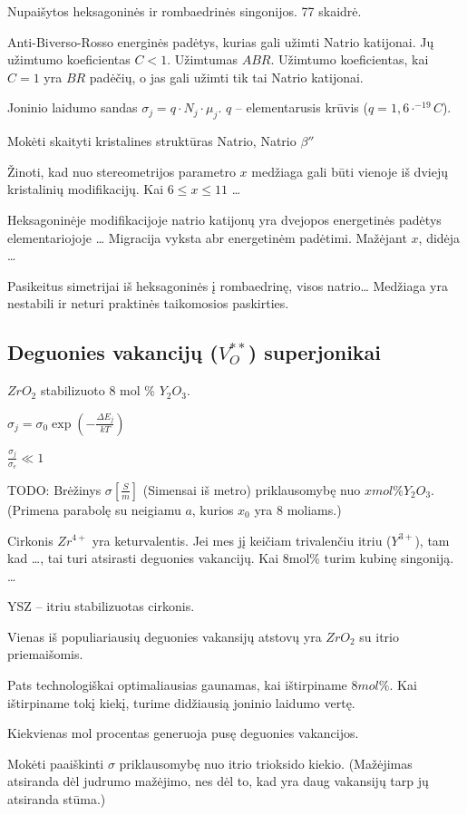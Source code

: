 Nupaišytos heksagoninės ir rombaedrinės singonijos. 77 skaidrė.

Anti-Biverso-Rosso energinės padėtys, kurias gali užimti Natrio
katijonai. Jų užimtumo koeficientas $C < 1$. Užimtumas $ABR$.
Užimtumo koeficientas, kai $C=1$ yra $BR$ padėčių, o jas gali užimti
tik tai Natrio katijonai.

Joninio laidumo sandas $\sigma_{j} = q\cdot N_{j} \cdot \mu_{j}$.
$q$ – elementarusis krūvis ($q = 1,6 \cdot^{-19}C$).

\begin{remember}
  \item Mokėti skaityti kristalines struktūras Natrio, Natrio $\beta''$
  \item Žinoti, kad nuo stereometrijos parametro $x$ medžiaga gali
    būti vienoje iš dviejų kristalinių modifikacijų. Kai
    $6 \leq x \leq 11$ …
  \item Heksagoninėje modifikacijoje natrio katijonų yra dvejopos
    energetinės padėtys elementariojoje … Migracija vyksta abr
    energetinėm padėtimi. Mažėjant $x$, didėja …
  \item Pasikeitus simetrijai iš heksagoninės į rombaedrinę, visos
    natrio… Medžiaga yra nestabili ir neturi praktinės taikomosios
    paskirties.
\end{remember}

\subsection{Deguonies vakancijų ($V_{O}^{**}$) superjonikai}

$ZrO_{2}$ stabilizuoto 8 mol \% $Y_{2}O_{3}$.

$\sigma_{j} = \sigma_{0} \exp\left( - \frac{\Delta E_{j}}{kT} \right)$

$\frac{\sigma_{j}}{\sigma_{e}} \ll 1$

TODO: Brėžinys $\sigma [\frac{S}{m}]$ (Simensai iš metro) priklausomybę
nuo $x mol \% Y_{2}O_{3}$. (Primena parabolę su neigiamu $a$, kurios
$x_{0}$ yra $8$ moliams.)

Cirkonis $Zr^{4+}$ yra keturvalentis. Jei mes jį keičiam trivalenčiu
itriu ($Y^{3+}$), tam kad …,  tai turi atsirasti deguonies vakancijų.
Kai 8mol\% turim kubinę singoniją. …

YSZ – itriu stabilizuotas cirkonis.

\begin{remember}
  \item Vienas iš populiariausių deguonies vakansijų atstovų yra
    $ZrO_{2}$ su itrio priemaišomis.
  \item Pats technologiškai optimaliausias gaunamas, kai
    ištirpiname $8 mol \%$. Kai ištirpiname tokį kiekį, turime
    didžiausią joninio laidumo vertę.
  \item Kiekvienas mol procentas generuoja pusę deguonies vakancijos.
  \item Mokėti paaiškinti $\sigma$ priklausomybę nuo itrio trioksido
    kiekio. (Mažėjimas atsiranda dėl judrumo mažėjimo, nes dėl
    to, kad yra daug vakansijų tarp jų atsiranda stūma.)
\end{remember}

